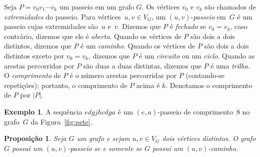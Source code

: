 \documentclass[12pt, a4paper]{article}
\newtheorem{prop}[teor]{Proposição}
\theoremstyle{definition}
\newtheorem{exem}[teor]{Exemplo}
\begin{document}
Seja $P = v_0v_1 \cdots v_k$ um passeio em um grafo $G$. Os vértices $v_0$ e $v_k$ são chamados de \emph{extremidades} do passeio. Para vértices~$u,v \in V_G$, um $(u,v)$-\textit{passeio} em~$G$ é um passeio cujas extremidades são~$u$ e~$v$. Dizemos que $P$ é \emph{fechado} se $v_0 = v_k$, caso contrário, dizemos que ele é \emph{aberto}. Quando os vértices de $P$ são dois a dois distintos, dizemos que $P$ é um \emph{caminho}. Quando os vértices de $P$ são dois a dois distintos exceto por $v_0 = v_k$, dizemos que $P$ é um \emph{circuito} ou um \emph{ciclo}. Quando as arestas percorridas por $P$ são duas a duas distintas, dizemos que $P$ é uma \emph{trilha}. O \emph{comprimento} de $P$ é o número arestas percorridas por $P$ (contando-se repetições); portanto, o comprimento de $P$ acima é $k$. Denotamos o comprimento de $P$ por $|P|$.

\begin{exem}
\label{exem:walk}
A sequência $edgjhcdga$ é um $(e,a)$-passeio de comprimen\-to~$8$ no grafo~$G$ da Figura~\ref{fig:pete}.
\end{exem}

\begin{prop}
Seja $G$ um grafo e sejam $u,v \in V_G$ dois vértices distintos. O grafo $G$ possui um $(u,v)$-passeio se e somente se $G$ possui um $(u,v)$-caminho.
\end{prop}
\end{document}
